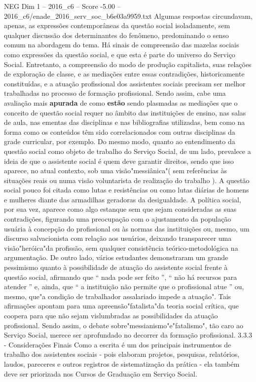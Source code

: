 \begin{textsample}{NEG Dim 1 – 2016\_c6 – Score -5.00 – 2016\_c6/enade\_2016\_serv\_soc\_b6e03a9959.txt}
Algumas respostas circundavam, apenas, as expressões contemporâneas da questão social isoladamente, sem qualquer discussão dos determinantes do fenômeno, predominando o senso comum na abordagem do tema.
Há sinais de compreensão das mazelas sociais como expressões da questão social, e que esta é parte do universo do Serviço Social.
Entretanto, a compreensão do modo de produção capitalista, suas relações de exploração de classe, e as mediações entre essas contradições, historicamente constituídas, e a atuação profissional dos assistentes sociais precisam ser melhor trabalhadas no processo de formação profissional.
Sendo assim, cabe uma avaliação mais \textbf{apurada} de como \textbf{estão} sendo plasmadas as mediações que o conceito de questão social requer no âmbito das instituições de ensino, nas salas de aula, nas ementas das disciplinas e nas bibliografias utilizadas, bem como na forma como os conteúdos têm sido correlacionados com outras disciplinas da grade curricular, por exemplo.
Do mesmo modo, quanto ao entendimento da questão social como objeto de trabalho do Serviço Social, de um lado, prevalece a ideia de que o assistente social é quem deve garantir direitos, sendo que isso aparece, no atual contexto, sob uma visão"messiânica"( sem referências às situações reais ou numa visão voluntarista de realização do trabalho ).
A questão social pouco foi citada como lutas e resistências ou como lutas diárias de homens e mulheres diante das armadilhas geradoras da desigualdade.
A política social, por sua vez, aparece como algo estanque sem que sejam consideradas as suas contradições, figurando uma preocupação com o ajustamento da população usuária à concepção do profissional ou às normas das instituições ou, mesmo, um discurso salvacionista com relação aos usuários, deixando transparecer uma visão"heróica"da profissão, sem qualquer consistência teórico-metodológica na argumentação.
De outro lado, vários estudantes demonstraram um grande pessimismo quanto à possibilidade de atuação do assistente social frente à questão social, afirmando que “ nada pode ser feito ”, “ não há recursos para atender ” e, ainda, que “ a instituição não permite que o profissional atue ” ou, mesmo, que"a condição de trabalhador assalariado impede a atuação".
Tais afirmações apontam para uma apreensão"fatalista"da teoria social crítica, que coopera para que não sejam vislumbradas as possibilidades da atuação profissional.
Sendo assim, o debate sobre"messianismo"e"fatalismo", tão caro ao Serviço Social, merece ser aprofundado no decorrer da formação profissional. 3.3.3 - Considerações Finais Como a escrita é um dos principais instrumentos de trabalho dos assistentes sociais - pois elaboram projetos, pesquisas, relatórios, laudos, pareceres e outros registros de sistematização da prática - ela também deve ser priorizada nos Cursos de Graduação em Serviço Social.

\end{textsample}
